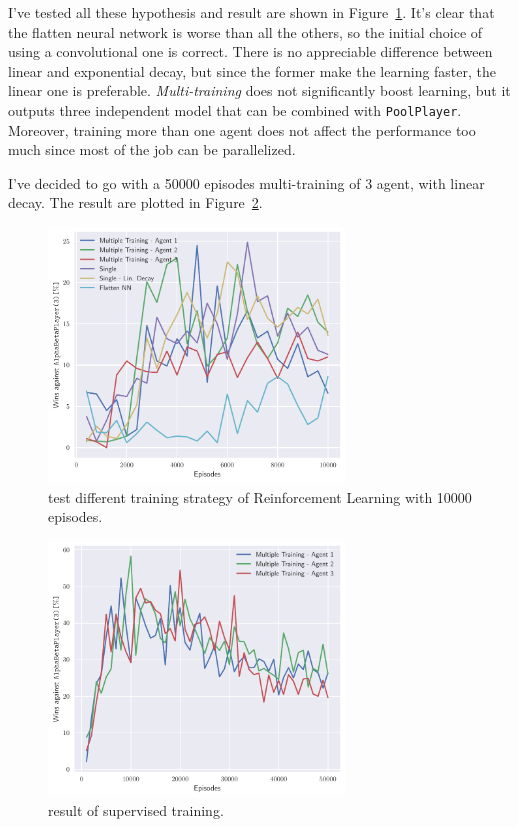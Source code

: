\documentclass{article}
\newcommand{\ipy}[1]{\texttt{#1}}
\begin{document}
  I've tested all these hypothesis and result are shown in Figure~\ref{fig:reinforcement10k}. It's clear that the flatten neural network is worse than all the others, so the initial choice of using a convolutional one is correct. There is no appreciable difference between linear and exponential decay, but since the former make the learning faster, the linear one is preferable.
  \emph{Multi-training} does not significantly boost learning, but it outputs three independent model that can be combined with \ipy{PoolPlayer}. Moreover, training more than one agent does not affect the performance too much since most of the job can be parallelized.
 
  I've decided to go with a 50000 episodes multi-training of 3 agent, with linear decay. The result are plotted in Figure~\ref{fig:reinforcement50k}. 
  

  \begin{figure}
    \centering
    \includegraphics[width=0.7\textwidth]{img/reinforcement-10k-comparsion.pdf}
    
    \caption{test different training strategy of Reinforcement Learning with 10000 episodes.}
    \label{fig:reinforcement10k}
  \end{figure}

  \begin{figure}
    \centering
    \includegraphics[width=0.7\textwidth]{img/reinforcement-50k.pdf}
    
    \caption{result of supervised training.}
    \label{fig:reinforcement50k}
  \end{figure}



  \printbibliography
\end{document}
